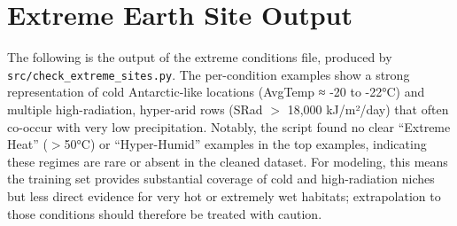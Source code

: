 \documentclass[11pt]{article}
\begin{document}
\section{Extreme Earth Site Output}
\label{app:extreme}
The following is the output of the extreme conditions file, produced
by \texttt{src/check\_extreme\_sites.py}. The per-condition examples show a strong representation of cold Antarctic-like
locations (AvgTemp ≈ -20 to -22°C) and multiple high-radiation, hyper-arid
rows (SRad $>$ 18,000 kJ/m²/day) that often co-occur with very low precipitation.
Notably, the script found no clear ``Extreme Heat'' ($>$50°C) or ``Hyper-Humid''
examples in the top examples, indicating these regimes are rare or absent in
the cleaned dataset. For modeling, this means the training set provides
substantial coverage of cold and high-radiation niches but less direct
evidence for very hot or extremely wet habitats; extrapolation to those
conditions should therefore be treated with caution.
\end{document}
